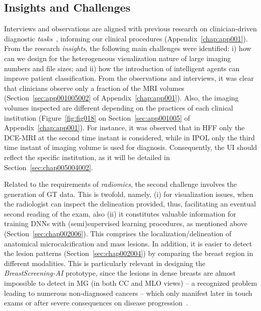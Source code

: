 \subsection{Insights and Challenges}
\label{sec:chap005003002}

Interviews and observations are aligned with previous research on clinician-driven diagnostic {\it tasks}~\cite{Sultanum:2018:MTP:3173574.3173996}, informing our clinical procedures (Appendix~\ref{chap:app001}).
From the research {\it insights}, the following main challenges were identified:
i) how can we design for the heterogeneous visualization nature of large imaging numbers and file sizes; and
ii) how the introduction of intelligent agents can improve patient classification.
From the  observations and interviews, it was clear that clinicians observe only a fraction of the \ac{MRI} volumes (Section~\ref{sec:app001005002} of Appendix~\ref{chap:app001}).
Also, the imaging volumes inspected are different depending on the practices of each clinical institution (Figure~\ref{fig:fig018} on Section~\ref{sec:app001005} of Appendix~\ref{chap:app001}).
For instance, it was observed that in \acs{HFF} only the \acs{DCE-MRI} at the second time instant is considered, while in \acs{IPOL} only the third time instant of imaging volume is used for diagnosis.
Consequently, the \ac{UI} should reflect the specific institution, as it will be detailed in Section~\ref{sec:chap005004002}.

Related to the requirements of {\it radiomics}, the second challenge involves the generation of \ac{GT} data.
This is twofold, namely,
(i) for visualization issues, when the radiologist can inspect the delineation provided, thus, facilitating an eventual second reading of the exam, also
(ii) it constitutes valuable information for training \acp{DNN} with (semi)supervised learning procedures, as mentioned above (Section~\ref{sec:chap002006}).
This comprises the localization/delineation of anatomical microcalcification and mass lesions.
In addition, it is easier to detect the lesion patterns (Section~\ref{sec:chap002004}) by comparing the breast region in different modalities.
This is particularly relevant in designing the {\it BreastScreening-AI} prototype, since the lesions in dense breasts are almost impossible to detect in \ac{MG} (in both \ac{CC} and \ac{MLO} views) -- a recognized problem leading to numerous non-diagnosed cancers -- which only manifest later in touch exams or after severe consequences on disease progression~\cite{mohamed2018deep}.


